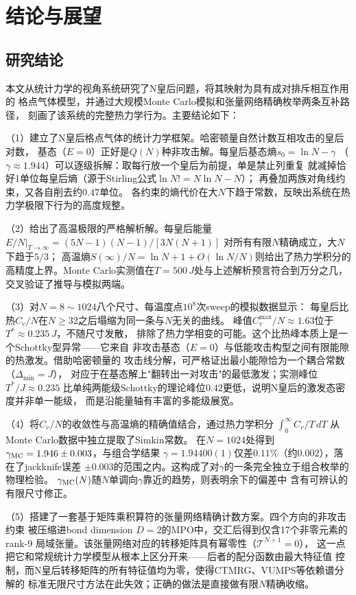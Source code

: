 \chapter{结论与展望}

\section{研究结论}

本文从统计力学的视角系统研究了N皇后问题，将其映射为具有成对排斥相互作用的
格点气体模型，并通过大规模Monte Carlo模拟和张量网络精确枚举两条互补路径，
刻画了该系统的完整热力学行为。主要结论如下：

（1）建立了N皇后格点气体的统计力学框架。哈密顿量自然计数互相攻击的皇后对数，
基态（$E=0$）正好是$Q(N)$种非攻击解。每皇后基态熵$s_{0}=\ln N-\gamma$
（$\gamma\approx1.944$）可以逐级拆解：取每行放一个皇后为前提，单是禁止列重复
就减掉恰好1单位每皇后熵（源于Stirling公式$\ln N! = N\ln N - N$）；
再叠加两族对角线约束，又各自削去约$0.47$单位。
各约束的熵代价在大$N$下趋于常数，反映出系统在热力学极限下行为的高度规整。

（2）给出了高温极限的严格解析解。每皇后能量
$E/N|_{T\to\infty}=(5N-1)(N-1)/[3N(N+1)]$
对所有有限$N$精确成立，大$N$下趋于$5/3$；
高温熵$S(\infty)/N=\ln N+1+O(\ln N/N)$则给出了热力学积分的
高精度上界。Monte Carlo实测值在$T=500\,J$处与上述解析预言符合到万分之几，
交叉验证了推导与模拟两端。

（3）对$N=8\sim1024$八个尺寸、每温度点$10^{8}$次sweep的模拟数据显示：
每皇后比热$C_{v}/N$在$N\ge32$之后塌缩为同一条与$N$无关的曲线。
峰值$C_{v}^{\max}/N\approx1.63$位于$T^{*}\approx0.235\,J$，不随尺寸发散，
排除了热力学相变的可能。这个比热峰本质上是一个Schottky型异常——它来自
非攻击基态（$E=0$）与低能攻击构型之间有限能隙的热激发。借助哈密顿量的
攻击线分解，可严格证出最小能隙恰为一个耦合常数（$\Delta_{\min}=J$），
对应于在基态解上"翻转出一对攻击"的最低激发；实测峰位$T^{\ast}/J\approx 0.235$
比单纯两能级Schottky的理论峰位$0.42$更低，说明N皇后的激发态密度并非单一能级，
而是沿能量轴有丰富的多能级展宽。

（4）将$C_{v}/N$的收敛性与高温熵的精确值结合，通过热力学积分
$\int_{0}^{\infty}C_{v}/T\,dT$ 从Monte Carlo数据中独立提取了Simkin常数。
在$N=1024$处得到$\gamma_{\rm MC}=1.946\pm0.003$，与组合学结果
$\gamma=1.94400(1)$仅差$0.11\%$（约$0.002$），落在了jackknife误差
$\pm0.003$的范围之内。这构成了对$\gamma$的一条完全独立于组合枚举的物理检验。
$\gamma_{\rm MC}(N)$随$N$单调向$\gamma$靠近的趋势，则表明余下的偏差中
含有可辨认的有限尺寸修正。

（5）搭建了一套基于矩阵乘积算符的张量网络精确计数方案。四个方向的非攻击约束
被压缩进bond dimension $D=2$的MPO中，交汇后得到仅含17个非零元素的rank-9
局域张量。该张量网络对应的转移矩阵具有幂零性（$\mathcal{T}^{N+1}=0$），
这一点把它和常规统计力学模型从根本上区分开来——后者的配分函数由最大特征值
控制，而N皇后转移矩阵的所有特征值均为零，使得CTMRG、VUMPS等依赖谱分解的
标准无限尺寸方法在此失效；正确的做法是直接做有限$N$精确收缩。

